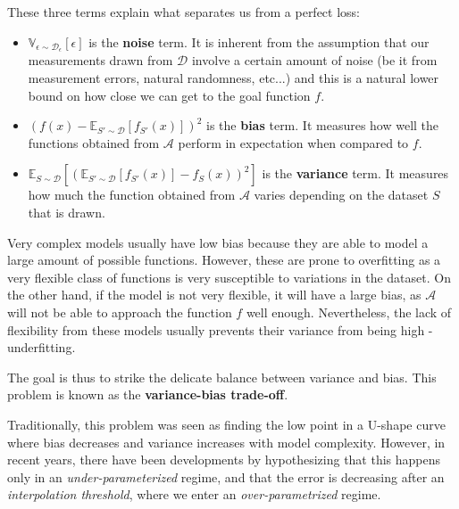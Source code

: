 \documentclass{article}
\newcommand{\E}{\mathbb{E}}
\newcommand{\var}{\mathbb{V}}
\newcommand{\dist}{\mathcal{D}}
\begin{document}
These three terms explain what separates us from a perfect loss:
\begin{itemize}
    \item $\var_{\epsilon \sim \dist_\epsilon} [ \epsilon ]$
	is the \textbf{noise} term. 
	It is inherent from the assumption that our measurements drawn from $\dist$ involve a certain amount of noise (be it from measurement errors, natural randomness, etc...) and this is a natural lower bound on how close we can get to the goal function $f$.
    \item $(f(x) - \E_{S' \sim \dist}[f_{S'}(x)])^2$
	is the \textbf{bias} term.
	It measures how well the functions obtained from $\mathcal{A}$ perform in expectation when compared to $f$.
    \item $\E_{S \sim \dist} \left[ (\E_{S' \sim \dist} [ f_{S'}(x) ] - f_S(x))^2 \right]$
	is the \textbf{variance} term.
	It measures how much the function obtained from $\mathcal{A}$ varies depending on the dataset $S$ that is drawn.
\end{itemize}

Very complex models usually have low bias because they are able to model a large amount of possible functions.
However, these are prone to overfitting as a very flexible class of functions is very susceptible to variations in the dataset.
On the other hand, if the model is not very flexible, it will have a large bias, as $\mathcal{A}$ will not be able to approach the function $f$ well enough.
Nevertheless, the lack of flexibility from these models usually prevents their variance from being high - underfitting.

The goal is thus to strike the delicate balance between variance and bias.
This problem is known as the \textbf{variance-bias trade-off}.

Traditionally, this problem was seen as finding the low point in a U-shape curve where bias decreases and variance increases with model complexity.
However, in recent years, there have been developments by hypothesizing that this happens only in an \textit{under-parameterized} regime, and that the error is decreasing after an \textit{interpolation threshold}, where we enter an \textit{over-parametrized} regime.
\end{document}
